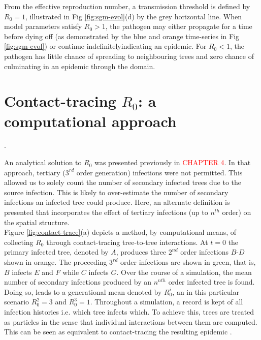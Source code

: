 From the effective reproduction number, a transmission threshold is defined by $R_0=1$, illustrated in Fig \ref{fig:sgm-evol}(d) by the grey horizontal line. When model parameters satisfy $R_0>1$, the pathogen may either propagate for a time before dying off (as demonstrated by the blue and orange time-series in Fig \ref{fig:sgm-evol}) or continue indefinitely\textemdash indicating an epidemic. For $R_0<1$, the pathogen has little chance of spreading to neighbouring trees and zero chance of culminating in an epidemic through the domain\protect\footnotemark {}.\\



\section{Contact-tracing $R_0$: a computational approach}.

An analytical solution to $R_0$ was presented previously in \textcolor{red}{CHAPTER 4}. %
In that approach, tertiary ($3^{rd}$ order generation) infections were not permitted. %
This allowed us to solely count the number of secondary infected trees due to the source infection. %
This is likely to over-estimate the number of secondary infections an infected tree could produce. %
Here, an alternate definition is presented that incorporates the effect of tertiary infections %
(up to $n^{th}$ order)  on the spatial structure.\\

Figure \ref{fig:contact-trace}(a) depicts a method, by computational means, of collecting $R_0$ %
through contact-tracing tree-to-tree interactions. %
At $t=0$ the primary infected tree, denoted by $A$, produces three $2^{nd}$ order infections %
$B$-$D$ shown in orange. %
The proceeding $3^{rd}$ order infections are shown in green, that is, $B$ infects $E$ and $F$ while $C$ infects $G$. %
Over the course of a simulation, the mean number of secondary infections produced by an $n^{nth}$ order infected tree is found. %
Doing so, leads to a generational mean denoted by $R^i_0$, an in this particular scenario $R^2_0=3$ and $R^3_0=1$. 
Throughout a simulation, a record is kept of all infection histories i.e. which tree infects which. 
To achieve this, trees are treated as particles in the sense that individual interactions between them are computed. 
This can be seen as equivalent to contact-tracing the resulting epidemic \cite{eames2003contact}. \\

